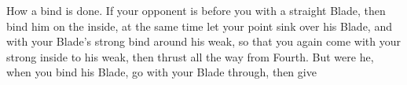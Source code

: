 \exercise{}

How a bind is done. If your opponent is before you with a straight
Blade, then bind him on the inside, at the same time let your point
sink over his Blade, and with your Blade's strong bind around his
weak, so that you again come with your strong inside to his weak, then
thrust all the way from Fourth. But were he, when you bind his Blade,
go with your Blade through, then give

